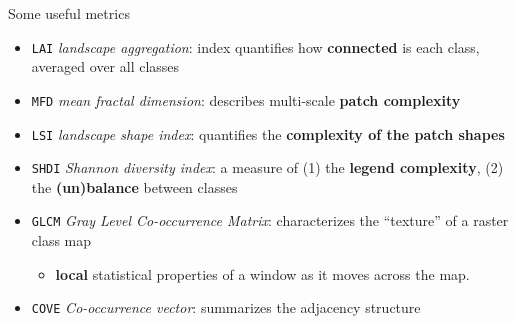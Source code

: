 \documentclass[aspectratio=169, 10pt]{beamer}
\begin{document}

\begin{frame}{Some useful metrics}
\begin{itemize}
    \item \texttt{LAI}   \emph{landscape aggregation}: index quantifies how \textbf{connected} is each class, averaged over all classes
    \item \texttt{MFD} \emph{mean fractal dimension}: describes multi-scale \textbf{patch complexity}
    \item \texttt{LSI} \emph{landscape shape index}: quantifies the \textbf{complexity of the patch shapes}
    \item \texttt{SHDI} \emph{Shannon diversity index}: a measure of (1) the \textbf{legend complexity}, (2) the \textbf{(un)balance} between classes
    \item \texttt{GLCM} \emph{Gray Level Co-occurrence Matrix}: characterizes the ``texture'' of a raster class map
      \begin{itemize}
      \item \textbf{local} statistical properties of a window as it moves across the map.
      \end{itemize}
    \item \texttt{COVE} \emph{Co-occurrence vector}: summarizes the adjacency structure
\end{itemize}    
\end{frame}


    
\end{document}
